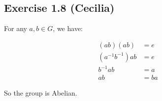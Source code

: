 \subsection*{Exercise 1.8 (Cecilia)}
For any $a,b \in G$, we have:

\begin{align*}
    (ab)(ab) &= e \\
    (a^{-1}b^{-1})ab &= e \\
    b^{-1}ab &= a \\
    ab &= ba
\end{align*}

So the group is Abelian.